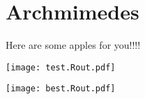 \section{Archmimedes}

Here are some apples for you!!!!

\texttt{[image: test.Rout.pdf]}

\texttt{[image: best.Rout.pdf]}

